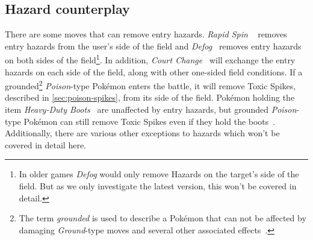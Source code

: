 \subsection{Hazard counterplay}
There are some moves that can remove entry hazards. \textit{Rapid Spin} 
~\autocite{Bulbapedia:RapidSpin} removes entry hazards from the user's side of the field and
\textit{Defog}~\autocite{Bulbapedia:Defog} removes entry hazards on both sides of the 
field\footnote{In older games \textit{Defog} would only remove Hazards on the
target's side of the field. But as we only investigate the latest version, this
won't be covered in detail.}. In addition, 
\textit{Court Change}~\autocite{Bulbapedia:CourtChange} will exchange the entry hazards
on each side of the field, along with other one-sided field conditions.
If a grounded\footnote{The term \textit{grounded} is used to describe a Pokémon that
can not be affected by damaging \textit{Ground}-type moves and several other associated 
effects~\autocite{Bulbapedia:Grounded}.}
\textit{Poison}-type Pokémon enters the battle, it will remove Toxic 
Spikes, described in \ref{sec:poison-spikes}, from its side of the field.
Pokémon holding the item 
\textit{Heavy-Duty Boots}~\autocite{Bulbapedia:HeavyDutyBoots} are unaffected by
entry hazards, but grounded \textit{Poison}-type Pokémon can still remove
Toxic Spikes even if they hold the boots~\autocite{Bulbapedia:EntryHazards}.
Additionally, there are various other exceptions to hazards which won't be covered in detail here.

